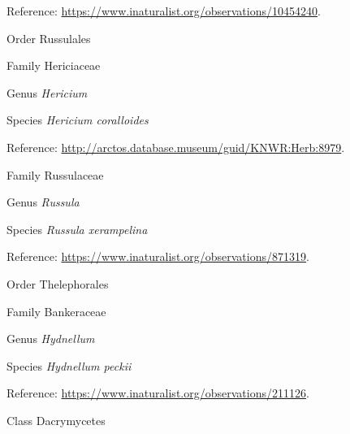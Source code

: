 \documentclass[9pt, article]{memoir}
\begin{document}
\begin{multicols}{2}
Reference: 
\url{https://www.inaturalist.org/observations/10454240}.

\vspace{6pt}\noindent\hspace{18pt}Order Russulales


\vspace{6pt}\noindent\hspace{24pt}Family Hericiaceae


\vspace{6pt}\noindent\hspace{30pt}Genus \textit{Hericium}


\vspace{6pt}\noindent\hspace{36pt}Species \textit{Hericium coralloides}


Reference: 
\url{http://arctos.database.museum/guid/KNWR:Herb:8979}.

\vspace{6pt}\noindent\hspace{24pt}Family Russulaceae


\vspace{6pt}\noindent\hspace{30pt}Genus \textit{Russula}


\vspace{6pt}\noindent\hspace{36pt}Species \textit{Russula xerampelina}


Reference: 
\url{https://www.inaturalist.org/observations/871319}.

\vspace{6pt}\noindent\hspace{18pt}Order Thelephorales


\vspace{6pt}\noindent\hspace{24pt}Family Bankeraceae


\vspace{6pt}\noindent\hspace{30pt}Genus \textit{Hydnellum}


\vspace{6pt}\noindent\hspace{36pt}Species \textit{Hydnellum peckii}


Reference: 
\url{https://www.inaturalist.org/observations/211126}.

\vspace{6pt}\noindent\hspace{12pt}Class Dacrymycetes



\end{multicols}
\end{document}
